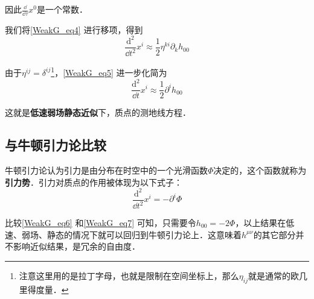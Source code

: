 因此$\frac{\dd}{\dd\tau}x^0$是一个常数．

我们将\autoref{WeakG_eq4} 进行移项，得到
\begin{equation}\label{WeakG_eq5}
\frac{\mathrm{d}^2}{\dd t^2}x^i\approx\frac{1}{2}\eta^{ki}\partial_kh_{00}
\end{equation}

由于$\eta^{ij}=\delta^{ij}$\footnote{注意这里用的是拉丁字母，也就是限制在空间坐标上，那么$\eta_{ij}$就是通常的欧几里得度量．}，\autoref{WeakG_eq5} 进一步化简为
\begin{equation}\label{WeakG_eq6}
\frac{\mathrm{d}^2}{\dd t}x^i\approx\frac{1}{2}\partial^ih_{00}
\end{equation}

这就是\textbf{低速弱场静态近似}下，质点的测地线方程．

\subsection{与牛顿引力论比较}

牛顿引力论认为引力是由分布在时空中的一个光滑函数$\Phi$决定的，这个函数就称为\textbf{引力势}．引力对质点的作用被体现为以下式子：
\begin{equation}\label{WeakG_eq7}
\frac{\mathrm{d}^2}{\dd t^2}x^i=-\partial^i\Phi
\end{equation}

比较\autoref{WeakG_eq6} 和\autoref{WeakG_eq7} 可知，只需要令$h_{00}=-2\Phi$，以上结果在低速、弱场、静态的情况下就可以回归到牛顿引力论上．这意味着$h^{\mu\nu}$的其它部分并不影响近似结果，是冗余的自由度．








